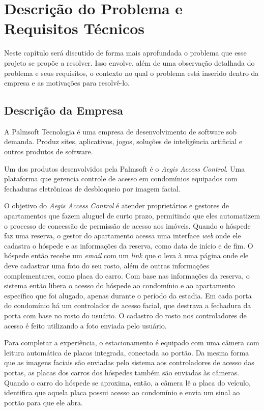 \chapter{Descrição do Problema e Requisitos Técnicos}

Neste capítulo será discutido de forma mais aprofundada o problema que esse projeto se propõe a resolver. Isso envolve, além de uma observação detalhada do problema e seus requisitos, o contexto no qual o problema está inserido dentro da empresa e as motivações para resolvê-lo.

\section{Descrição da Empresa}

A Palmsoft Tecnologia é uma empresa de desenvolvimento de software sob demanda. Produz sites, aplicativos, jogos, soluções de inteligência artificial e outros produtos de software.

Um dos produtos desenvolvidos pela Palmsoft é o \textit{Aegis Access Control}. Uma plataforma que gerencia controle de acesso em condomínios equipados com fechaduras eletrônicas de desbloqueio por imagem facial.

O objetivo do \textit{Aegis Access Control} é atender proprietários e gestores de apartamentos que fazem aluguel de curto prazo, permitindo que eles automatizem o processo de concessão de permissão de acesso aos imóveis. Quando o hóspede faz uma reserva, o gestor do apartamento acessa uma interface \textit{web} onde ele cadastra o hóspede e as informações da reserva, como data de início e de fim. O hóspede então recebe um \textit{email} com um \textit{link} que o leva à uma página onde ele deve cadastrar uma foto do seu rosto, além de outras informações complementares, como placa do carro. Com base nas informações da reserva, o sistema então libera o acesso do hóspede ao condomínio e ao apartamento específico que foi alugado, apenas durante o período da estadia. Em cada porta do condomínio há um controlador de acesso facial, que destrava a fechadura da porta com base no rosto do usuário. O cadastro do rosto nos controladores de acesso é feito utilizando a foto enviada pelo usuário.

Para completar a experiência, o estacionamento é equipado com uma câmera com leitura automática de placas integrada, conectada ao portão. Da mesma forma que as imagens faciais são enviadas pelo sistema aos controladores de acesso das portas, as placas dos carros dos hóspedes também são enviadas às câmeras. Quando o carro do hóspede se aproxima, então, a câmera lê a placa do veículo, identifica que aquela placa possui acesso ao condomínio e envia um sinal ao portão para que ele abra.

